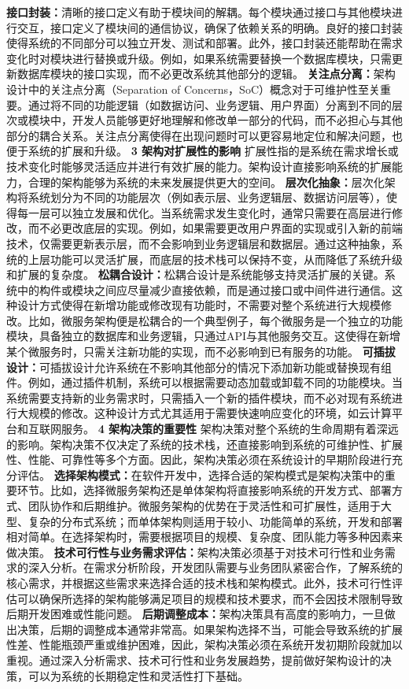 \textbf{接口封装：}清晰的接口定义有助于模块间的解耦。每个模块通过接口与其他模块进行交互，接口定义了模块间的通信协议，确保了依赖关系的明确。良好的接口封装使得系统的不同部分可以独立开发、测试和部署。此外，接口封装还能帮助在需求变化时对模块进行替换或升级。例如，如果系统需要替换一个数据库模块，只需更新数据库模块的接口实现，而不必更改系统其他部分的逻辑。
\textbf{关注点分离：}架构设计中的关注点分离（Separation of
Concerns，SoC）概念对于可维护性至关重要。通过将不同的功能逻辑（如数据访问、业务逻辑、用户界面）分离到不同的层次或模块中，开发人员能够更好地理解和修改单一部分的代码，而不必担心与其他部分的耦合关系。关注点分离使得在出现问题时可以更容易地定位和解决问题，也便于系统的扩展和升级。
\textbf{3 架构对扩展性的影响} 扩展性指的是系统在需求增长或技术变化时能够灵活适应并进行有效扩展的能力。架构设计直接影响系统的扩展能力，合理的架构能够为系统的未来发展提供更大的空间。
\textbf{层次化抽象：}层次化架构将系统划分为不同的功能层次（例如表示层、业务逻辑层、数据访问层等），使得每一层可以独立发展和优化。当系统需求发生变化时，通常只需要在高层进行修改，而不必更改底层的实现。例如，如果需要更改用户界面的实现或引入新的前端技术，仅需要更新表示层，而不会影响到业务逻辑层和数据层。通过这种抽象，系统的上层功能可以灵活扩展，而底层的技术栈可以保持不变，从而降低了系统升级和扩展的复杂度。
\textbf{松耦合设计：}松耦合设计是系统能够支持灵活扩展的关键。系统中的构件或模块之间应尽量减少直接依赖，而是通过接口或中间件进行通信。这种设计方式使得在新增功能或修改现有功能时，不需要对整个系统进行大规模修改。比如，微服务架构便是松耦合的一个典型例子，每个微服务是一个独立的功能模块，具备独立的数据库和业务逻辑，只通过API与其他服务交互。这使得在新增某个微服务时，只需关注新功能的实现，而不必影响到已有服务的功能。
\textbf{可插拔设计：}可插拔设计允许系统在不影响其他部分的情况下添加新功能或替换现有组件。例如，通过插件机制，系统可以根据需要动态加载或卸载不同的功能模块。当系统需要支持新的业务需求时，只需插入一个新的插件模块，而不必对现有系统进行大规模的修改。这种设计方式尤其适用于需要快速响应变化的环境，如云计算平台和互联网服务。
\textbf{4 架构决策的重要性} 架构决策对整个系统的生命周期有着深远的影响。架构决策不仅决定了系统的技术栈，还直接影响到系统的可维护性、扩展性、性能、可靠性等多个方面。因此，架构决策必须在系统设计的早期阶段进行充分评估。
\textbf{选择架构模式：}在软件开发中，选择合适的架构模式是架构决策中的重要环节。比如，选择微服务架构还是单体架构将直接影响系统的开发方式、部署方式、团队协作和后期维护。微服务架构的优势在于灵活性和可扩展性，适用于大型、复杂的分布式系统；而单体架构则适用于较小、功能简单的系统，开发和部署相对简单。在选择架构时，需要根据项目的规模、复杂度、团队能力等多种因素来做决策。
\textbf{技术可行性与业务需求评估：}架构决策必须基于对技术可行性和业务需求的深入分析。在需求分析阶段，开发团队需要与业务团队紧密合作，了解系统的核心需求，并根据这些需求来选择合适的技术栈和架构模式。此外，技术可行性评估可以确保所选择的架构能够满足项目的规模和技术要求，而不会因技术限制导致后期开发困难或性能问题。
\textbf{后期调整成本：}架构决策具有高度的影响力，一旦做出决策，后期的调整成本通常非常高。如果架构选择不当，可能会导致系统的扩展性差、性能瓶颈严重或维护困难，因此，架构决策必须在系统开发初期阶段就加以重视。通过深入分析需求、技术可行性和业务发展趋势，提前做好架构设计的决策，可以为系统的长期稳定性和灵活性打下基础。
